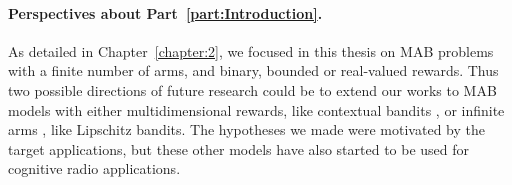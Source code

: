 \paragraph{Perspectives about \textbf{Part~\ref{part:Introduction}}.}



As detailed in Chapter~\ref{chapter:2}, we focused in this thesis on MAB problems with a finite number of arms, and binary, bounded or real-valued rewards.
Thus two possible directions of future research could be to extend our works
to MAB models with either multidimensional rewards, like contextual bandits \cite{Li10,Luo18,ChenLeeLuoWei2019}, or infinite arms \cite{valko2016bandits,Combes17}, like Lipschitz bandits.
The hypotheses we made were motivated by the target applications, but these other models have also started to be used for cognitive radio applications.



